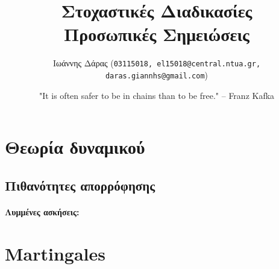 \documentclass[a4paper,oneside, 11pt]{article}
\title{\textbf{Στοχαστικές Διαδικασίες \\ Προσωπικές Σημειώσεις}}
\author{ Ιωάννης Δάρας (\texttt{03115018, el15018@central.ntua.gr, daras.giannhs@gmail.com}) \\
}
\date{"It is often safer to be in chains than to be free." -- Franz Kafka}
\begin{document}
\maketitle
\noindent\makebox[\linewidth]{\rule{\paperwidth}{0.4pt}}

\section{Θεωρία δυναμικού}
\subsection{Πιθανότητες απορρόφησης}
\paragraph{Λυμμένες ασκήσεις:}

\section{Martingales}


\end{document}
